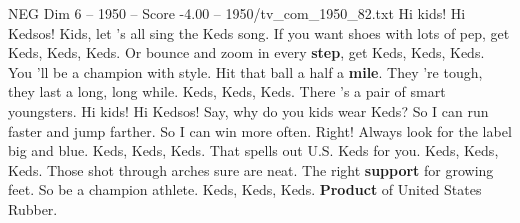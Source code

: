 \begin{textsample}{NEG Dim 6 – 1950 – Score -4.00 – 1950/tv\_com\_1950\_82.txt}  \label{ex:f6_neg_085}
Hi kids!
Hi Kedsos!
Kids, let 's all sing the Keds song.
If you want shoes with lots of pep, get Keds, Keds, Keds.
Or bounce and zoom in every \textbf{step}, get Keds, Keds, Keds.
You 'll be a champion with style.
Hit that ball a half a \textbf{mile}.
They 're tough, they last a long, long while.
Keds, Keds, Keds.
There 's a pair of smart youngsters.
Hi kids!
Hi Kedsos!
Say, why do you kids wear Keds?
So I can run faster and jump farther.
So I can win more often.
Right!
Always look for the label big and blue.
Keds, Keds, Keds.
That spells out U.S.
Keds for you.
Keds, Keds, Keds.
Those shot through arches sure are neat.
The right \textbf{support} for growing feet.
So be a champion athlete.
Keds, Keds, Keds. \textbf{Product} of United States Rubber.

\end{textsample}

